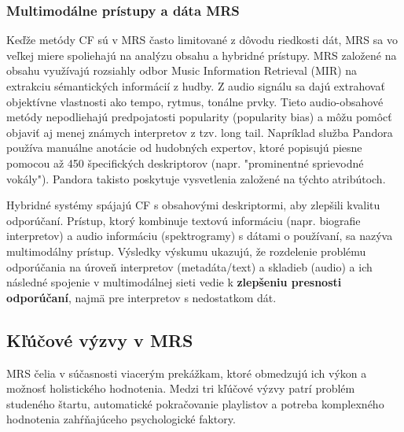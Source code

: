 \subsubsection{Multimodálne prístupy a dáta MRS}
Keďže metódy CF sú v MRS často limitované z dôvodu riedkosti dát, MRS sa vo veľkej miere spoliehajú na analýzu obsahu a hybridné prístupy.\cite{Ricci}
MRS založené na obsahu využívajú rozsiahly odbor Music Information Retrieval (MIR) na extrakciu sémantických informácií z hudby. Z audio signálu sa dajú extrahovať objektívne vlastnosti ako tempo, rytmus, tonálne prvky. Tieto audio-obsahové metódy nepodliehajú predpojatosti popularity (popularity bias) a môžu pomôcť objaviť aj menej známych interpretov z tzv. long tail. \cite{Ricci} 
Napríklad služba Pandora používa manuálne anotácie od hudobných expertov, ktoré popisujú piesne pomocou až 450 špecifických deskriptorov (napr. "prominentné sprievodné vokály"). Pandora takisto poskytuje vysvetlenia založené na týchto atribútoch.\cite{Ricci, challenges}

Hybridné systémy spájajú CF s obsahovými deskriptormi, aby zlepšili kvalitu odporúčaní.\cite{Ricci} 
Prístup, ktorý kombinuje textovú informáciu (napr. biografie interpretov) a audio informáciu (spektrogramy) s dátami o používaní, sa nazýva multimodálny prístup. Výsledky výskumu ukazujú, že rozdelenie problému odporúčania na úroveň interpretov (metadáta/text) a skladieb (audio) a ich následné spojenie v multimodálnej sieti vedie k \textbf{zlepšeniu presnosti odporúčaní}, najmä pre interpretov s nedostatkom dát.\cite{coldstart}


\subsection{Kľúčové výzvy v MRS}
MRS čelia v súčasnosti viacerým prekážkam, ktoré obmedzujú ich výkon a možnosť holistického hodnotenia. Medzi tri kľúčové výzvy patrí problém studeného štartu, automatické pokračovanie playlistov a potreba komplexného hodnotenia zahŕňajúceho psychologické faktory.

